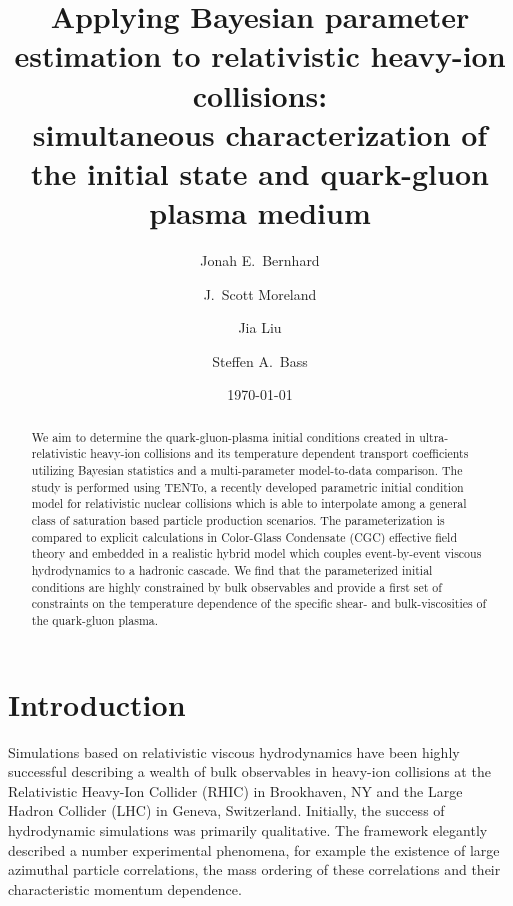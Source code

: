 \documentclass[aps,prc,reprint,amsmath,nofootinbib,superscriptaddress]{revtex4-1}
\newcommand{\trento}{T\raisebox{-0.5ex}{R}ENTo}
\begin{document}
\title{
  Applying Bayesian parameter estimation to relativistic heavy-ion collisions: \\
  simultaneous characterization of the initial state and quark-gluon plasma medium
}

\author{Jonah E.\ Bernhard}
\author{J.\ Scott Moreland}

\author{Jia Liu}

\author{Steffen A.\ Bass}

\date{\today}

\begin{abstract}
We aim to determine the quark-gluon-plasma initial conditions created in ultra-relativistic heavy-ion collisions and its temperature dependent transport coefficients utilizing Bayesian statistics and a multi-parameter model-to-data comparison.
The study is performed using \trento, a recently developed parametric initial condition model for relativistic nuclear collisions which is able to interpolate among a general class of saturation based particle production scenarios.
The parameterization is compared to explicit calculations in Color-Glass Condensate (CGC) effective field theory and embedded in a realistic hybrid model which couples event-by-event viscous hydrodynamics to a hadronic cascade.
We find that the parameterized initial conditions are highly constrained by bulk observables and provide a first set of constraints on the temperature dependence of the specific shear- and bulk-viscosities of the quark-gluon plasma.
\end{abstract}

\maketitle


\section{Introduction}

Simulations based on relativistic viscous hydrodynamics have been highly successful describing a wealth of bulk observables in heavy-ion collisions at the Relativistic Heavy-Ion Collider (RHIC) in Brookhaven, NY and the Large Hadron Collider (LHC) in Geneva, Switzerland.
Initially, the success of hydrodynamic simulations was primarily qualitative.
The framework elegantly described a number experimental phenomena, for example the existence of large azimuthal particle correlations, the mass ordering of these correlations and their characteristic momentum dependence.
\end{document}
